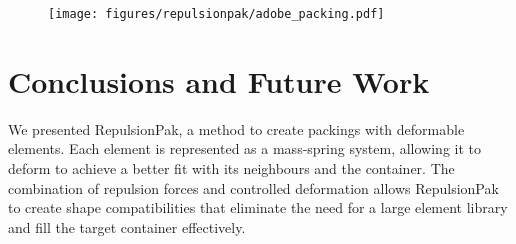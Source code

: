 \begin{figure}
\centering
\texttt{[image: figures/repulsionpak/adobe\_packing.pdf]} 
\caption[A RepulsionPak packing printed on a t-shirt]
{\label{adobe_packing}
}
\end{figure}







\section{Conclusions and Future Work}
\label{repulsionpak_conclusions}


We presented RepulsionPak, a method to create packings with deformable elements.
Each element is represented as a
mass-spring system, allowing it to deform to achieve a better fit with
its neighbours and the container.
The combination of repulsion forces and controlled deformation
allows RepulsionPak to create shape compatibilities that
eliminate the need for a large element library
and fill the target container effectively.


